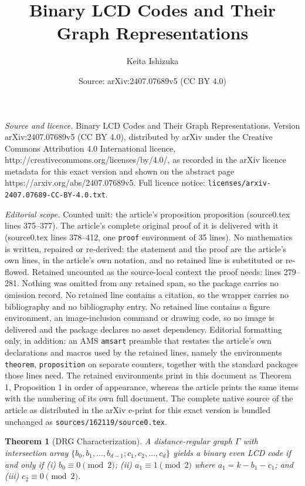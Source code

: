 \documentclass[10pt,a4paper]{amsart}
\title{Binary LCD Codes and Their Graph Representations}
\author{Keita Ishizuka}
\date{Source: arXiv:2407.07689v5 (CC BY 4.0)}
\newtheorem{theorem}{Theorem}
\begin{document}
\maketitle

\noindent\emph{Source and licence.} Binary LCD Codes and Their Graph Representations. Version arXiv:2407.07689v5 (CC BY 4.0), distributed by arXiv under the Creative Commons Attribution 4.0 International licence, http://creativecommons.org/licenses/by/4.0/, as recorded in the arXiv licence metadata for this exact version and shown on the abstract page https://arxiv.org/abs/2407.07689v5. Full licence notice: \texttt{licenses/arxiv-2407.07689-CC-BY-4.0.txt}.\par\smallskip

\noindent\textit{Editorial scope.} Counted unit: the article's proposition proposition (source0.tex lines 375--377). The article's complete original proof of it is delivered with it (source0.tex lines 378--412, one \texttt{proof} environment of 35 lines). No mathematics is written, repaired or re-derived: the statement and the proof are the article's own lines, in the article's own notation, and no retained line is substituted or re-flowed.  Retained uncounted as the source-local context the proof needs: lines 279--281.  Nothing was omitted from any retained span, so the package carries no omission record.  No retained line contains a citation, so the wrapper carries no bibliography and no bibliography entry.  No retained line contains a figure environment, an image-inclusion command or drawing code, so no image is delivered and the package declares no asset dependency.  Editorial formatting only, in addition: an AMS \texttt{amsart} preamble that restates the article's own declarations and macros used by the retained lines, namely the environments \texttt{theorem}, \texttt{proposition} on separate counters, together with the standard packages those lines need.  The retained environments print in this document as Theorem 1, Proposition 1 in order of appearance, whereas the article prints the same items with the numbering of its own full document.  The complete native source of the article as distributed in the arXiv e-print for this exact version is bundled unchanged as \texttt{sources/162119/source0.tex}.
\begin{theorem}[DRG Characterization]\label{thm:drg-main}
A distance-regular graph $\Gamma$ with intersection array $\{b_0, b_1, \ldots, b_{d-1}; c_1, c_2, \ldots, c_d\}$ yields a binary even LCD code if and only if (i) $b_0 \equiv 0 \pmod 2$; (ii) $a_1 \equiv 1 \pmod 2$ where $a_1 = k - b_1 - c_1$; and (iii) $c_2 \equiv 0 \pmod 2$.
\end{theorem}
\end{document}
